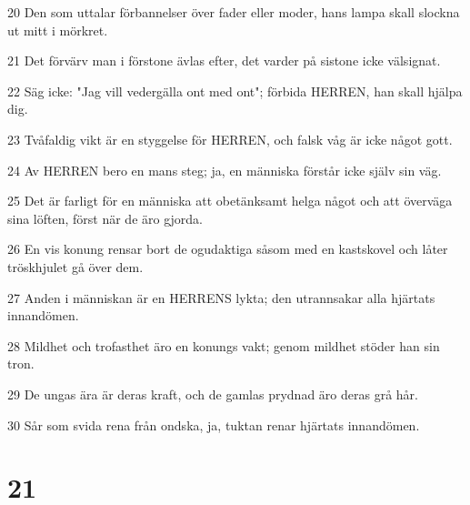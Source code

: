 \par 20 Den som uttalar förbannelser över fader eller moder, hans lampa skall slockna ut mitt i mörkret.
\par 21 Det förvärv man i förstone ävlas efter, det varder på sistone icke välsignat.
\par 22 Säg icke: "Jag vill vedergälla ont med ont"; förbida HERREN, han skall hjälpa dig.
\par 23 Tvåfaldig vikt är en styggelse för HERREN, och falsk våg är icke något gott.
\par 24 Av HERREN bero en mans steg; ja, en människa förstår icke själv sin väg.
\par 25 Det är farligt för en människa att obetänksamt helga något och att överväga sina löften, först när de äro gjorda.
\par 26 En vis konung rensar bort de ogudaktiga såsom med en kastskovel och låter tröskhjulet gå över dem.
\par 27 Anden i människan är en HERRENS lykta; den utrannsakar alla hjärtats innandömen.
\par 28 Mildhet och trofasthet äro en konungs vakt; genom mildhet stöder han sin tron.
\par 29 De ungas ära är deras kraft, och de gamlas prydnad äro deras grå hår.
\par 30 Sår som svida rena från ondska, ja, tuktan renar hjärtats innandömen.

\chapter{21}

